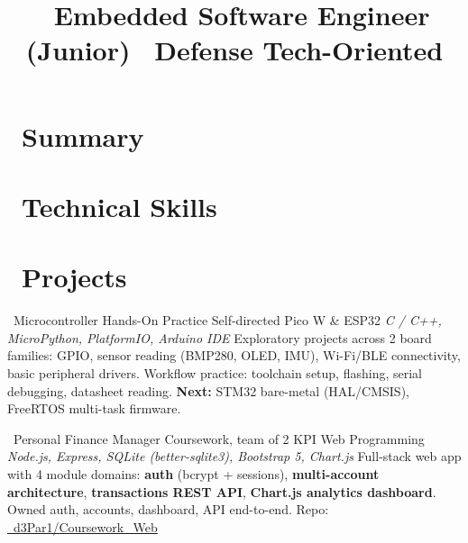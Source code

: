 \documentclass[10pt,a4paper,sans]{moderncv}
\title{\faMicrochip\ Embedded Software Engineer (Junior) \quad \faShieldAlt\ Defense Tech-Oriented}
\begin{document}
\makecvtitle
\vspace{-1.2em}

\section{\faUser\ Summary}

\section{\faCogs\ Technical Skills}

\section{\faFolderOpen\ Projects}

        {\faMicrochip\ Microcontroller Hands-On Practice}
        {Self-directed}
        {Pico W \& ESP32}
        {\textit{C / C++, MicroPython, PlatformIO, Arduino IDE}}
        {\small Exploratory projects across 2 board families: GPIO, sensor reading (BMP280, OLED, IMU), Wi-Fi/BLE connectivity, basic peripheral drivers. Workflow practice: toolchain setup, flashing, serial debugging, datasheet reading. \textbf{Next:} STM32 bare-metal (HAL/CMSIS), FreeRTOS multi-task firmware.}

        {\faChartLine\ Personal Finance Manager}
        {Coursework, team of 2}
        {KPI Web Programming}
        {\textit{Node.js, Express, SQLite (better-sqlite3), Bootstrap 5, Chart.js}}
        {\small Full-stack web app with 4 module domains: \textbf{auth} (bcrypt + sessions), \textbf{multi-account architecture}, \textbf{transactions REST API}, \textbf{Chart.js analytics dashboard}. Owned auth, accounts, dashboard, API end-to-end. Repo: \href{https://github.com/d3Par1/Coursework_Web}{\faGithub\ d3Par1/Coursework\_Web}}
\end{document}
